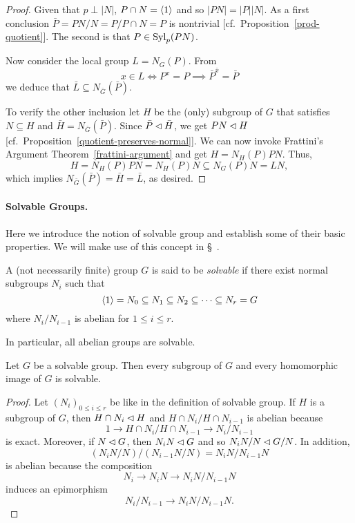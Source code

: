 \begin{proof} Given that $p\perp|N|$, $P\cap N=\langle1\rangle$ and so $|PN|=|P||N|$. As a first conclusion $\bar P=PN/N=P/P\cap N=P$ is nontrivial [cf.~Proposition~\ref{prod-quotient}]. The second is that $P\in{\rm Syl}_p(PN)$.

Now consider the local group $L=N_G(P)$. From
$$
    x\in L\iff P^x=P \implies \bar P^{\bar x}=\bar P
$$
we deduce that $\bar L\subseteq N_{\bar G}(\bar P)$.

To verify the other inclusion let $H$ be the (only) subgroup of $G$ that satisfies $N\subseteq H$ and $\bar H=N_{\bar G}(\bar P)$. Since $\bar P\lhd\bar H$, we get $PN\lhd H$ [cf.~Proposition~\ref{quotient-preserves-normal}]. We can now invoke Frattini's Argument Theorem~\ref{frattini-argument} and get $H=N_H(P)PN$. Thus,
$$
    H=N_H(P)PN=N_H(P)N\subseteq N_G(P)N=LN,
$$
which implies $N_{\bar G}(\bar P)=\bar H=\bar L$, as desired.  \end{proof}

\paragraph{Solvable Groups.} Here we introduce the notion of solvable group and establish some of their basic properties. We will make use of this concept in \S~.

\medskip

\begin{defn}\label{solvable-defn}
    A (not necessarily finite) group\/ $G$ is said to be \textsl{solvable} if there exist normal subgroups $N_i$ such that
    $$
        \langle1\rangle=N_0\subseteq N_1\subseteq N_2\subseteq\cdots\subseteq N_r=G
    $$
    where\/ $N_i/N_{i-1}$ is abelian for\/ $1\le i\le r$.

    In particular, all abelian groups are solvable.
\end{defn}


\begin{prop}\label{solvable-subgroups-and-quotients}
    Let\/ $G$ be a solvable group. Then every subgroup of\/ $G$ and every homomorphic image of\/ $G$ is solvable.
\end{prop}

\begin{proof} Let $(N_i)_{0\le i\le r}$ be like in the definition of solvable group. If $H$ is a subgroup of $G$, then $H\cap N_i\lhd H$ and $H\cap N_i/H\cap N_{i-1}$ is abelian because
$$
    1\to H\cap N_i/H\cap N_{i-1} \to N_i/N_{i-1}
$$
is exact. Moreover, if $N\lhd G$, then $N_iN\lhd G$ and so $N_iN/N\lhd G/N$. In addition,
$$
    (N_iN/N)/(N_{i-1}N/N)=N_iN/N_{i-1}N
$$
is abelian because the composition
$$
    N_i\to N_iN\to N_iN/N_{i-1}N
$$
induces an epimorphism
$$
    N_i/N_{i-1}\to N_iN/N_{i-1}N.
$$
 \end{proof}

